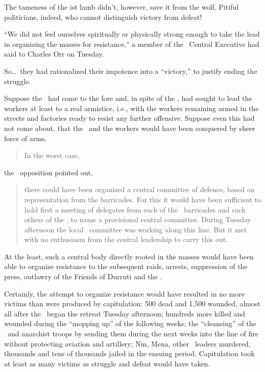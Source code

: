 The tameness of the \POUM ist lamb didn’t, however, save it from the wolf. Pitiful politicians, indeed, who cannot distinguish victory from defeat!

``We did not feel ourselves spiritually or physically strong enough to take the lead in organizing the masses for resistance,'' a member of the \POUM\ Central Executive had said to Charles Orr on Tuesday.

So\dots\ they had rationalized their impotence into a ``victory,'' to justify ending the struggle.

Suppose the \POUM\ had come to the fore and, in spite of the \CNT, had sought to lead the workers at least to a real armistice, i.e., with the workers remaining armed in the streets and factories ready to resist any further offensive. Suppose even this had not come about, that the \POUM\ and the workers would have been conquered by sheer force of arms.

\begin{quotation}
  In the worst case,
\end{quotation}
the \POUM\ opposition pointed out,

\begin{quotation}
  \noindent
  there could have been organized a central committee of defence, based on representation from the barricades. For this it would have been sufficient to hold first a meeting of delegates from each of the \POUM\ barricades and such others of the \CNT, to name a provisional central committee. During Tuesday afternoon the local \POUM\ committee was working along this line. But it met with no enthusiasm from the central leadership to carry this out.
\end{quotation}

At the least, such a central body directly rooted in the masses would have been able to organize resistance to the subsequent raids, arrests, suppression of the press, outlawry of the Friends of Durruti and the \POUM.

Certainly, the attempt to organize resistance would have resulted in no more victims than were produced by capitulation: 500 dead and 1,500 wounded, almost all after the \CNT\ began the retreat Tuesday afternoon; hundreds more killed and wounded during the ``mopping up'' of the following weeks; the ``cleansing'' of the \POUM\ and anarchist troops by sending them during the next weeks into the line of fire without protecting aviation and artillery; Nin, Mena, other \POUM\ leaders murdered, thousands and tens of thousands jailed in the ensuing period. Capitulation took at least as many victims as struggle and defeat would have taken.

